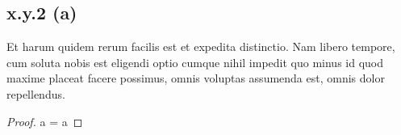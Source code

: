 \documentclass{exam}
\begin{document}
\subsection*{x.y.2 (a)}
Et harum quidem rerum facilis est et expedita distinctio. Nam libero tempore, cum soluta nobis est 
eligendi optio cumque nihil impedit quo minus id quod maxime placeat facere possimus, omnis voluptas assumenda est, 
omnis dolor repellendus. 
\begin{proof}
     a = a
\end{proof}
\end{document}

